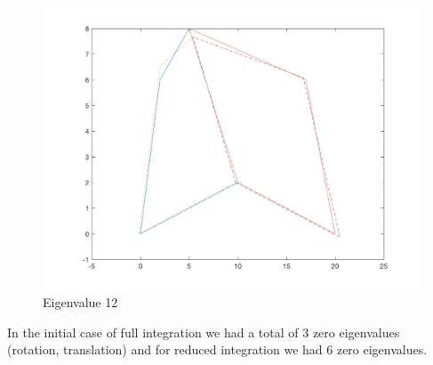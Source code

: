\documentclass[11pt]{amsart}
\begin{document}
\begin{figure}[H]
\begin{minipage}[b]{0.5\linewidth}
    \centering
    \includegraphics[width=.5\linewidth]{eigenvectors/eigenvector_12_redint.png} 
    \caption{Eigenvalue 12} 
    \vspace{4ex}
  \end{minipage} 
\end{figure}



In the initial case of full integration we had a total of 3 zero eigenvalues (rotation, translation) and for reduced integration we had 6 zero eigenvalues.
\end{document}
